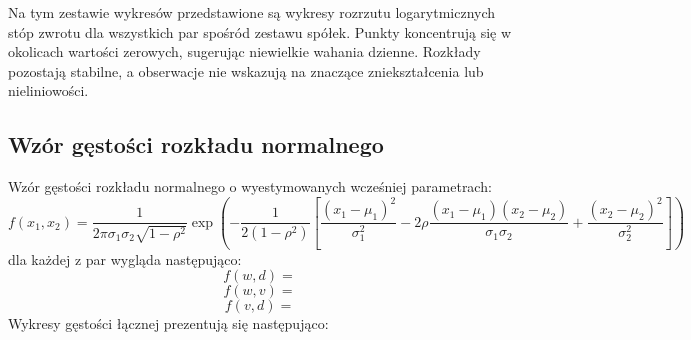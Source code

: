 \documentclass[a4paper,11pt]{article}
\begin{document}
Na tym zestawie wykresów przedstawione są wykresy rozrzutu logarytmicznych stóp zwrotu dla wszystkich par spośród zestawu spółek. Punkty koncentrują się w okolicach wartości zerowych, sugerując niewielkie wahania dzienne. Rozkłady pozostają stabilne, a obserwacje nie wskazują na znaczące zniekształcenia lub nieliniowości.

\subsection{Wzór gęstości rozkładu normalnego}
Wzór gęstości rozkładu normalnego o wyestymowanych wcześniej parametrach:
$$f(x_1,x_2)=\frac{1}{2\pi\sigma_1\sigma_2\sqrt{1-\rho^2}}\exp\left(-\frac{1}{2(1-\rho^2)}\left[\frac{(x_1-\mu_1)^2}{\sigma_1^2}-2\rho\frac{(x_1-\mu_1)(x_2-\mu_2)}{\sigma_1\sigma_2}+\frac{(x_2-\mu_2)^2}{\sigma_2^2}\right]\right)$$
dla każdej z par wygląda następująco:
$$f(w,d)=$$
$$f(w,v)=$$
$$f(v,d)=$$
Wykresy gęstości łącznej prezentują się następująco:
\end{document}
